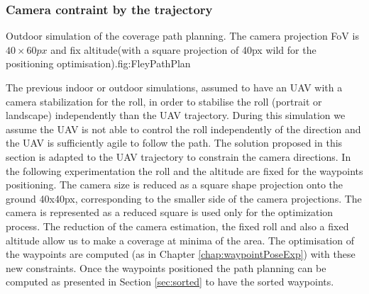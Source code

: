  \subsubsection{Camera contraint by the trajectory} \label{sec:holonomie path}
  \begin{mfigures}[!]{Outdoor simulation of the coverage path planning. The camera projection FoV is $40 \times 60 px$  and fix altitude(with  a square projection of 40px wild for the positioning optimisation).}{fig:FleyPathPlan} \centering
\hspace{1cm}
\tabsimuposeFleyPathHolonom
\end{mfigures} 

The previous indoor or outdoor simulations, assumed to have an UAV with a camera stabilization for the roll, in order to stabilise the roll (portrait or landscape) independently than the UAV trajectory.
During this simulation we assume the UAV is not able to control the roll independently of the direction and the UAV is sufficiently agile to follow the path.
The solution proposed in this section is adapted to the UAV trajectory to constrain the camera directions. 
In the following experimentation the roll and the altitude are fixed for the waypoints positioning. The camera size is reduced as a square shape projection onto the ground 40x40px, corresponding to the smaller side of the camera projections. The camera is represented as a reduced square is used only for the optimization process.
 The reduction of the camera estimation, the fixed roll and also a fixed altitude allow us to make a coverage at minima of the area.
The optimisation of the waypoints are computed (as in Chapter \ref{chap:waypointPoseExp}) with these new constraints. Once the waypoints positioned  
the path planning can be computed as presented in Section \ref{sec:sorted} to have the sorted waypoints.

